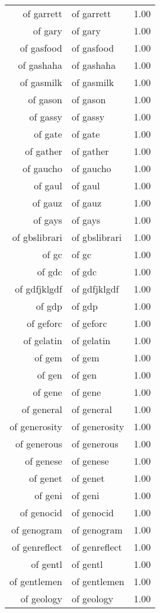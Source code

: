 \begin{table}[ht]
\begin{tabular}{rlr}
  of garrett & of garrett & 1.00 \\ 
  of gary & of gary & 1.00 \\ 
  of gasfood & of gasfood & 1.00 \\ 
  of gashaha & of gashaha & 1.00 \\ 
  of gasmilk & of gasmilk & 1.00 \\ 
  of gason & of gason & 1.00 \\ 
  of gassy & of gassy & 1.00 \\ 
  of gate & of gate & 1.00 \\ 
  of gather & of gather & 1.00 \\ 
  of gaucho & of gaucho & 1.00 \\ 
  of gaul & of gaul & 1.00 \\ 
  of gauz & of gauz & 1.00 \\ 
  of gays & of gays & 1.00 \\ 
  of gbslibrari & of gbslibrari & 1.00 \\ 
  of gc & of gc & 1.00 \\ 
  of gdc & of gdc & 1.00 \\ 
  of gdfjklgdf & of gdfjklgdf & 1.00 \\ 
  of gdp & of gdp & 1.00 \\ 
  of geforc & of geforc & 1.00 \\ 
  of gelatin & of gelatin & 1.00 \\ 
  of gem & of gem & 1.00 \\ 
  of gen & of gen & 1.00 \\ 
  of gene & of gene & 1.00 \\ 
  of general & of general & 1.00 \\ 
  of generosity & of generosity & 1.00 \\ 
  of generous & of generous & 1.00 \\ 
  of genese & of genese & 1.00 \\ 
  of genet & of genet & 1.00 \\ 
  of geni & of geni & 1.00 \\ 
  of genocid & of genocid & 1.00 \\ 
  of genogram & of genogram & 1.00 \\ 
  of genreflect & of genreflect & 1.00 \\ 
  of gentl & of gentl & 1.00 \\ 
  of gentlemen & of gentlemen & 1.00 \\ 
  of geology & of geology & 1.00 \\ 

\end{tabular}
\end{table}
